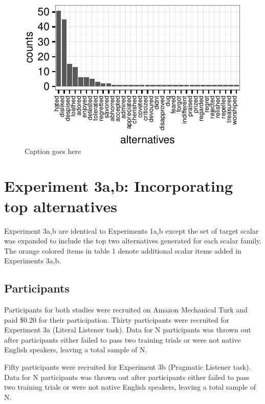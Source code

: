 \documentclass[10pt, letterpaper]{article}
\newenvironment{CodeChunk}{}{}
\begin{document}
\begin{CodeChunk}
\begin{figure}[t]

{\centering \includegraphics{figs/exp2_altsPlot_likedLoved-1} 

}

\caption[Caption goes here]{Caption goes here}\label{fig:exp2_altsPlot_likedLoved}
\end{figure}
\end{CodeChunk}

\section{Experiment 3a,b: Incorporating top
alternatives}\label{experiment-3ab-incorporating-top-alternatives}

Experiment 3a,b are identical to Experiments 1a,b except the set of
target scalar was expanded to include the top two alternatives generated
for each scalar family. The orange colored items in table 1 denote
additional scalar items added in Experiments 3a,b.

\subsection{Participants}\label{participants-2}

Participants for both studies were recruited on Amazon Mechanical Turk
and paid \$0.20 for their participation. Thirty participants were
recruited for Experiment 3a (Literal Listener task). Data for N
participants was thrown out after participants either failed to pass two
training trials or were not native English speakers, leaving a total
sample of N.

Fifty participants were recruited for Experiment 3b (Pragmatic Listener
task). Data for N participants was thrown out after participants either
failed to pass two training trials or were not native English speakers,
leaving a total sample of N.
\end{document}

